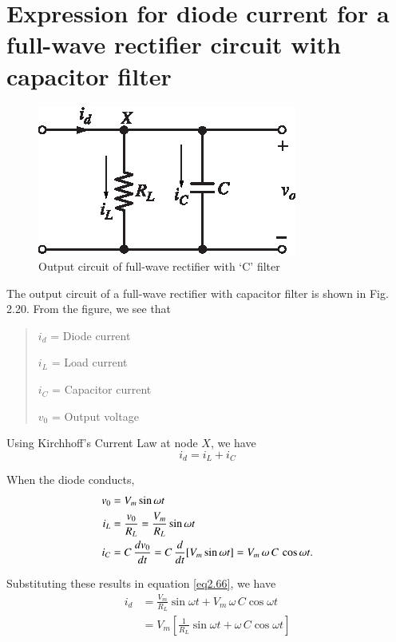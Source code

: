 \eject

\section{Expression for diode current for a full-wave rectifier
  circuit with capacitor filter}\label{eq2.24}
\begin{figure}[H]
\centering
\includegraphics[scale=1.1]{chap2/add-fig/S3-EE-02-020.eps}
\caption{Output circuit of full-wave rectifier with `C' filter}\label{fig2.20}
\end{figure}

The output circuit of a full-wave rectifier with capacitor filter is
shown in Fig. 2.20. From the figure, we see that
\begin{quote}
$i_d$ = Diode current

$i_L$ = Load current

$i_C$ = Capacitor current

$v_0$ = Output voltage
\end{quote}

Using Kirchhoff's Current Law at node $X$, we have
\begin{equation}
i_d = i_L + i_C \label{eq2.66}
\end{equation}

When the diode conducts,
\begin{align}
v_0 & = V_m \sin \omega t \label{eq2.67}\\
i_L & = \frac{v_0}{R_L} = \frac{V_m}{R_L} \sin \omega t \notag\\
i_C & = C\, \frac{dv_0}{dt} = C\, \frac{d}{dt} [V_m \sin \omega t]  = V_m\,
\omega\, C\, \cos \omega t.
\end{align}

Substituting these results in equation \eqref{eq2.66}, we have
\begin{align}
i_d & = \frac{V_m}{R_L} \sin \omega t + V_m\, \omega\, C \cos \omega t\\
& = V_m \left[\frac{1}{R_L} \sin \omega t + \omega\, C \cos \omega t \right] \label{eq2.68}
\end{align}

